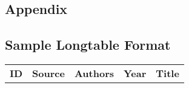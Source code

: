 \newpage
\begin{appendix}
\renewcommand{\thesection}{\Alph{section}}
\renewcommand{\appendixname}{Appendix}
\renewcommand{\thesubsection}{\thesection.\arabic{subsection}}
\renewcommand\thefigure{\thesection.\arabic{figure}}
\renewcommand\thetable{\thesection.\arabic{table}}
\setcounter{table}{0}
\setcounter{figure}{0}

\begin{landscape}

\section{Appendix}
\subsection{Sample Longtable Format}
\label{app:sample}

\renewcommand{\arraystretch}{1.2}
\begin{longtable}{
>{\centering\arraybackslash}m{1cm} %
>{\centering\arraybackslash}m{2.5cm} %
>{\centering\arraybackslash}m{4cm} %
>{\centering\arraybackslash}m{1.8cm} %
>{\centering\arraybackslash}m{13cm} %
}

 \rowcolor[rgb]{ .149,  .149,  .149}
 \textcolor[rgb]{ 1,  1,  1}{\textbf{ID}} & 
 \textcolor[rgb]{ 1,  1,  1}{\textbf{Source}} & 
 \textcolor[rgb]{ 1,  1,  1}{\textbf{Authors}} & 
 \textcolor[rgb]{ 1,  1,  1}{\textbf{Year}} &
 \textcolor[rgb]{ 1,  1,  1}{\textbf{Title}} \\



\end{longtable}
\end{landscape}
\end{appendix}
